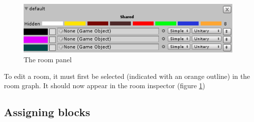 \documentclass[a4paper]{article}
\begin{document}
	\begin{figure}[h]
		\includegraphics[width=\linewidth]{img/Menu_EditRoom.PNG}
		\caption{The room panel}
		\label{fig:edit_room}
	\end{figure}
	
	To edit a room, it must first be selected (indicated with an orange outline) in the room graph. It should now appear in the room inspector (figure \ref{fig:edit_room})
	
	\subsection{Assigning blocks}
	
\end{document}

